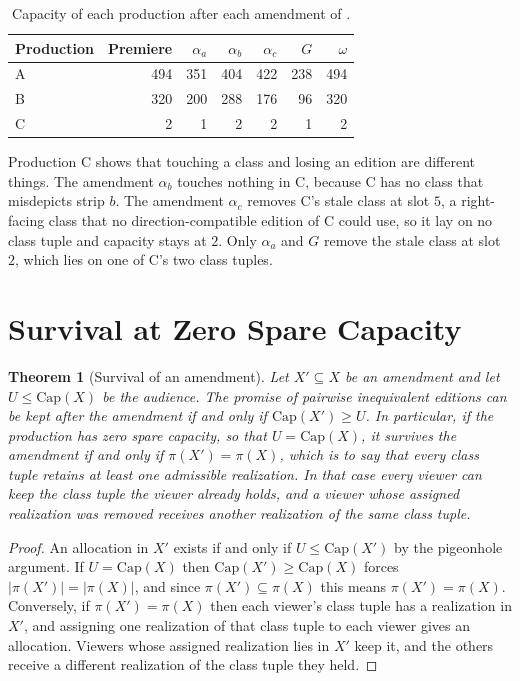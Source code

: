 \documentclass[11pt,twoside,openright]{book}
\theoremstyle{plain}
\newtheorem{theorem}{Theorem}[chapter]
\theoremstyle{definition}
\theoremstyle{remark}
\newcommand{\Capac}{\mathrm{Cap}}
\begin{document}
\begin{table}[ht]
\centering
\begin{tabular}{@{}lrrrrrr@{}}
\toprule
Production & Premiere & $\alpha_a$ & $\alpha_b$ & $\alpha_c$ & $G$ & $\omega$\\
\midrule
A & 494 & 351 & 404 & 422 & 238 & 494\\
B & 320 & 200 & 288 & 176 & 96 & 320\\
C & 2 & 1 & 2 & 2 & 1 & 2\\
\bottomrule
\end{tabular}
\caption{Capacity of each production after each amendment of .}\label{tab:after}
\end{table}

Production C shows that touching a class and losing an edition are different things. The amendment $\alpha_b$ touches nothing in C, because C has no class that misdepicts strip $b$. The amendment $\alpha_c$ removes C's stale class at slot $5$, a right-facing class that no direction-compatible edition of C could use, so it lay on no class tuple and capacity stays at $2$. Only $\alpha_a$ and $G$ remove the stale class at slot $2$, which lies on one of C's two class tuples.

\section{Survival at Zero Spare Capacity}\label{sec:zero}

\begin{theorem}[Survival of an amendment]\label{thm:survive}
Let $X'\subseteq X$ be an amendment and let $U\le\Capac(X)$ be the audience. The promise of pairwise inequivalent editions can be kept after the amendment if and only if $\Capac(X')\ge U$. In particular, if the production has zero spare capacity, so that $U=\Capac(X)$, it survives the amendment if and only if $\pi(X')=\pi(X)$, which is to say that every class tuple retains at least one admissible realization. In that case every viewer can keep the class tuple the viewer already holds, and a viewer whose assigned realization was removed receives another realization of the same class tuple.
\end{theorem}

\begin{proof}
An allocation in $X'$ exists if and only if $U\le\Capac(X')$ by the pigeonhole argument. If $U=\Capac(X)$ then $\Capac(X')\ge\Capac(X)$ forces $\lvert\pi(X')\rvert=\lvert\pi(X)\rvert$, and since $\pi(X')\subseteq\pi(X)$ this means $\pi(X')=\pi(X)$. Conversely, if $\pi(X')=\pi(X)$ then each viewer's class tuple has a realization in $X'$, and assigning one realization of that class tuple to each viewer gives an allocation. Viewers whose assigned realization lies in $X'$ keep it, and the others receive a different realization of the class tuple they held.
\end{proof}
\end{document}
